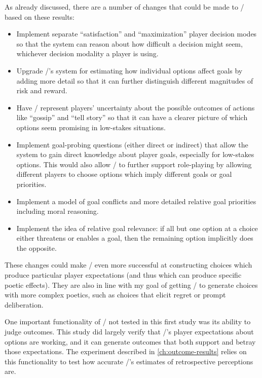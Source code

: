 As already discussed, there are a number of changes that could be made to \dunyazad/ based on these results:
%
\begin{itemize}
  \item Implement separate ``satisfaction'' and ``maximization'' player decision modes so that the system can reason about how difficult a decision might seem, whichever decision modality a player is using.
  \item Upgrade \dunyazad/'s system for estimating how individual options affect goals by adding more detail so that it can further distinguish different magnitudes of risk and reward.
  \item Have \dunyazad/ represent players' uncertainty about the possible outcomes of actions like ``gossip'' and ``tell story'' so that it can have a clearer picture of which options seem promising in low-stakes situations.
  \item Implement goal-probing questions (either direct or indirect) that allow the system to gain direct knowledge about player goals, especially for low-stakes options. This would also allow \dunyazad/ to further support role-playing by allowing different players to choose options which imply different goals or goal priorities.
  \item Implement a model of goal conflicts and more detailed relative goal priorities including moral reasoning.
  \item Implement the idea of relative goal relevance: if all but one option at a choice either threatens or enables a goal, then the remaining option implicitly does the opposite.
\end{itemize}
%
These changes could make \dunyazad/ even more successful at constructing choices which produce particular player expectations (and thus which can produce specific poetic effects).
%
They are also in line with my goal of getting \dunyazad/ to generate choices with more complex poetics, such as choices that elicit regret or prompt deliberation.


One important functionality of \dunyazad/ not tested in this first study was its ability to judge outcomes.
%
This study did largely verify that \dunyazad/'s player expectations about options are working, and it can generate outcomes that both support and betray those expectations.
%
The experiment described in \cref{ch:outcome-results} relies on this functionality to test how accurate \dunyazad/'s estimates of retrospective perceptions are.
